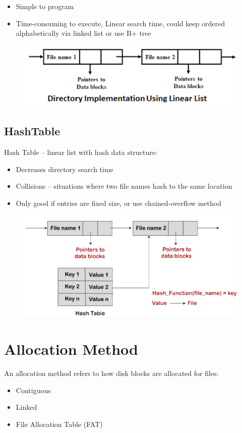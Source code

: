 \begin{itemize}
    \item Simple to program
    \item Time-consuming to execute,  Linear search time, could keep ordered alphabetically via linked list or use B+ tree
\end{itemize}


\begin{figure}[h!]
    \centering
    \includegraphics[width=0.5\linewidth]{img/dndsgvg.png}
\end{figure}

\subsection{HashTable}
Hash Table – linear list with hash data structure:
\begin{itemize}
    \item Decreases directory search time
    \item Collisions – situations where two file names hash to the same location
    \item Only good if entries are fixed size, or use chained-overflow method
\end{itemize}


\begin{figure}[h!]
    \centering
    \includegraphics[width=0.5\linewidth]{img/dghgf.png}
\end{figure}

\section{Allocation Method}

An allocation method refers to how disk blocks are allocated for files:

\begin{itemize}
    \item Contiguous
    \item Linked
    \item File Allocation Table (FAT)
\end{itemize}

